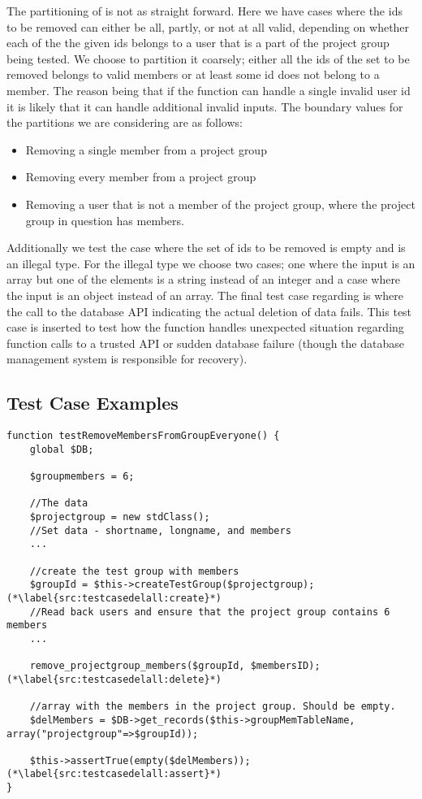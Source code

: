 The partitioning of \varuserids{} is not as straight forward.
Here we have cases where the ids to be removed can either be all, partly, or not at all valid, depending on whether each of the the given ids belongs to a user that is a part of the project group being tested.
We choose to partition it coarsely; either all the ids of the set to be removed belongs to valid members or at least some id does not belong to a member.
The reason being that if the function can handle a single invalid user id it is likely that it can handle additional invalid inputs.
The boundary values for the partitions we are considering are as follows: 
\begin{itemize}
	\item Removing a single member from a project group
	\item Removing every member from a project group
	\item Removing a user that is not a member of the project group, where the project group in question has members.
\end{itemize}
Additionally we test the case where the set of ids to be removed is empty and is an illegal type.
For the illegal type we choose two cases; one where the input is an array but one of the elements is a string instead of an integer and a case where the input is an object instead of an array.
The final test case regarding \varuserids{} is where the call to the database API indicating the actual deletion of data fails.
This test case is inserted to test how the function handles unexpected situation regarding function calls to a trusted API or sudden database failure (though the database management system is responsible for recovery).

\subsection{Test Case Examples}
\label{sub:testCaseEg}
\begin{lstlisting}[style=phpCode, caption=\myCaption{A test case for the function \fu{remove\_projectgroup\_members}. The test case tests if the function correctly removes all the members of the project group when instructed to}, label=src:testcasedelall]
function testRemoveMembersFromGroupEveryone() {
	global $DB;
	
	$groupmembers = 6;
	
	//The data
	$projectgroup = new stdClass(); 
	//Set data - shortname, longname, and members
	...
	
	//create the test group with members
	$groupId = $this->createTestGroup($projectgroup); (*\label{src:testcasedelall:create}*)
	//Read back users and ensure that the project group contains 6 members
	...
	
	remove_projectgroup_members($groupId, $membersID); (*\label{src:testcasedelall:delete}*)
	
	//array with the members in the project group. Should be empty.
	$delMembers = $DB->get_records($this->groupMemTableName, array("projectgroup"=>$groupId));
	
	$this->assertTrue(empty($delMembers)); (*\label{src:testcasedelall:assert}*)
}
\end{lstlisting}

